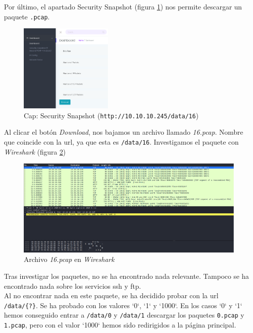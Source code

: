 Por último, el apartado Security Snapshot (figura \ref{fig:cap-snapshot}) nos permite descargar un paquete \texttt{.pcap}.

\begin{figure}[h]
    \centering
    \includegraphics[width=0.40\textwidth]{images/machines/cap/web-sec-snapshots.png}
    \caption{Cap: Security Snapshot (\texttt{http://10.10.10.245/data/16})}
    \label{fig:cap-snapshot}
\end{figure}

Al clicar el botón \textit{Download}, nos bajamos un archivo llamado \textit{16.pcap}. Nombre que coincide con la \acrshort{url}, ya que esta es \texttt{/data/16}. Investigamos el paquete con \textit{Wireshark}\cite{wireshark} (figura \ref{fig:cap-wire-16})

\begin{figure}[h]
    \centering
    \includegraphics[width=1.0\textwidth]{images/machines/cap/wireshark-16.png}
    \caption{Archivo \textit{16.pcap} en \textit{Wireshark}}
    \label{fig:cap-wire-16}
\end{figure}

Tras investigar los paquetes, no se ha encontrado nada relevante. Tampoco se ha encontrado nada sobre los servicios \acrshort{ssh} y \acrshort{ftp}.\\

Al no encontrar nada en este paquete, se ha decidido probar con la \acrshort{url} \texttt{/data/\{?\}}. Se ha probado con los valores `0`, `1` y `1000`. En los casos `0` y `1` hemos conseguido entrar a \texttt{/data/0} y \texttt{/data/1} descargar los paquetes \texttt{0.pcap} y \texttt{1.pcap}, pero con el valor `1000` hemos sido redirigidos a la página principal.\\

